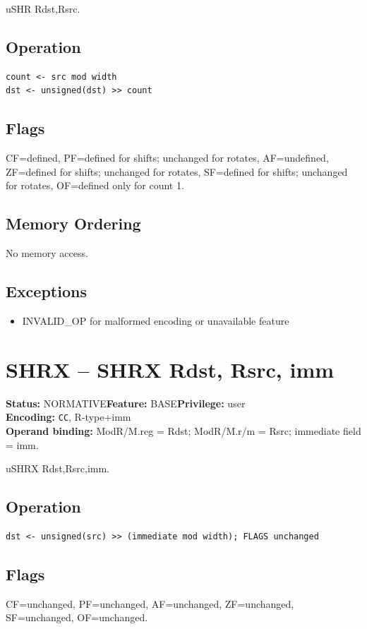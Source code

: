\documentclass[10pt]{article}
\begin{document}
uSHR Rdst,Rsrc.

\subsection*{Operation}
\begin{lstlisting}
count <- src mod width
dst <- unsigned(dst) >> count
\end{lstlisting}
\subsection*{Flags}
CF=defined, PF=defined for shifts; unchanged for rotates, AF=undefined, ZF=defined for shifts; unchanged for rotates, SF=defined for shifts; unchanged for rotates, OF=defined only for count 1.
\subsection*{Memory Ordering}
No memory access.
\subsection*{Exceptions}
\begin{itemize}
\item INVALID\_OP for malformed encoding or unavailable feature
\end{itemize}
\clearpage

\section{SHRX -- SHRX Rdst, Rsrc, imm}
\textbf{Status:} NORMATIVE\quad \textbf{Feature:} BASE\quad \textbf{Privilege:} user\\
\textbf{Encoding:} \texttt{CC}, R-type+imm\\
\textbf{Operand binding:} ModR/M.reg = Rdst; ModR/M.r/m = Rsrc; immediate field = imm.

uSHRX Rdst,Rsrc,imm.

\subsection*{Operation}
\begin{lstlisting}
dst <- unsigned(src) >> (immediate mod width); FLAGS unchanged
\end{lstlisting}
\subsection*{Flags}
CF=unchanged, PF=unchanged, AF=unchanged, ZF=unchanged, SF=unchanged, OF=unchanged.
\end{document}
